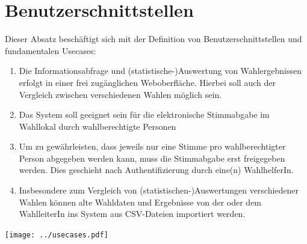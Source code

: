 \documentclass[a4paper,12pt]{article}
\begin{document}
\section{Benutzerschnittstellen}
Dieser Absatz beschäftigt sich mit der Definition von Benutzerschnittstellen und fundamentalen Usecases:

\begin{enumerate}
  \item Die Informationsabfrage und (statistische-)Auswertung von Wahlergebnissen erfolgt
        in einer frei zugänglichen Weboberfläche. Hierbei soll auch der Vergleich zwischen 
        verschiedenen Wahlen möglich sein. 
  \item Das System soll geeignet sein für die elektronische Stimmabgabe im Wahllokal durch
        wahlberechtigte Personen
  \item Um zu gewährleisten, dass jeweils nur eine Stimme pro wahlberechtigter Person abgegeben
        werden kann, muss die Stimmabgabe erst freigegeben werden. Dies geschieht nach
        Authentifizierung durch eine(n) WahlhelferIn.
  \item Insbesondere zum Vergleich von (statistischen-)Auswertungen verschiedener Wahlen können
        alte Wahldaten und Ergebnisse von der oder dem WahlleiterIn ins System aus CSV-Dateien 
        importiert werden.
\end{enumerate}

\begin{center}
	\texttt{[image: ../usecases.pdf]}
\end{center}
\end{document}
